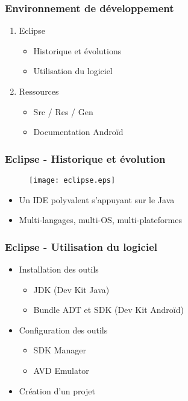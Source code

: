 \documentclass{beamer}
\begin{document}
\begin{frame}
  \frametitle{Environnement de développement}
  \begin{enumerate}
    \item Eclipse
    \begin{itemize}
        \item Historique et évolutions
        \item Utilisation du logiciel
    \end{itemize}
    \item Ressources
        \begin{itemize}
        \item Src / Res / Gen
        \item Documentation Androïd
    \end{itemize}
  \end{enumerate}
\end{frame}



\begin{frame}
  \frametitle{Eclipse - Historique et évolution}
      \begin{figure}
         \centering
          \texttt{[image: eclipse.eps]}
      \end{figure}
    \begin{itemize}
        \item Un IDE polyvalent s'appuyant sur le Java
        \item Multi-langages, multi-OS, multi-plateformes
    \end{itemize}
\end{frame}



\begin{frame}
  \frametitle{Eclipse - Utilisation du logiciel}
    \begin{itemize}
        \item Installation des outils
            \begin{itemize}
             \item JDK (Dev Kit Java)
              \item Bundle ADT et SDK (Dev Kit Androïd)
            \end{itemize}
        \item Configuration des outils
            \begin{itemize}
                \item SDK Manager
                \item AVD Emulator
            \end{itemize}
        \item Création d'un projet
    \end{itemize}
\end{frame}
\end{document}

